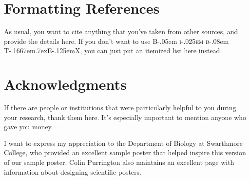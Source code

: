 \documentclass[thesis]{hmcposter}
\providecommand{\bibtex}{{\rmfamily B\kern-.05em%
    \textsc{i\kern-.025em b}\kern-.08em%
    T\kern-.1667em\lower.7ex\hbox{E}\kern-.125emX}}
\begin{document}
\begin{poster}
\section{Formatting References}

As usual, you want to cite anything that you've taken from other
sources, and provide the details here.  If you don't want to use
\bibtex, you can just put an itemized list here instead.




\vfill

\section{Acknowledgments}

If there are people or institutions that were particularly helpful
to you during your research, thank them here.  It's especially
important to mention anyone who gave you money.

I want to express my appreciation to the Department of Biology at
Swarthmore College, who provided an excellent sample poster
\citep{swarthmore-poster} that helped inspire this version of our
sample poster.  Colin Purrington also maintains an excellent page
with information about designing scientific
posters. \citeyearpar{purrington-sciposters}

\vfill
\end{poster}
\end{document}
